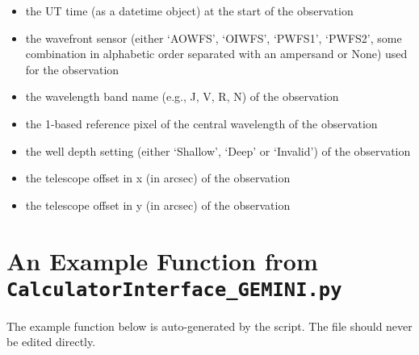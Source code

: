 \documentclass[letterpaper,10pt,english]{sphinxmanual}
\begin{document}
\begin{itemize}
\item {} 
the UT time (as a datetime object) at the start of the observation

\end{itemize}

\begin{itemize}
\item {} 
the wavefront sensor (either `AOWFS', `OIWFS', `PWFS1', `PWFS2', some
combination in alphabetic order separated with an ampersand or None) used for
the observation

\end{itemize}

\begin{itemize}
\item {} 
the wavelength band name (e.g., J, V, R, N) of the observation

\end{itemize}

\begin{itemize}
\item {} 
the 1-based reference pixel of the central wavelength of the observation

\end{itemize}

\begin{itemize}
\item {} 
the well depth setting (either `Shallow', `Deep' or `Invalid') of the
observation

\end{itemize}

\begin{itemize}
\item {} 
the telescope offset in x (in arcsec) of the observation

\end{itemize}

\begin{itemize}
\item {} 
the telescope offset in y (in arcsec) of the observation

\end{itemize}


\chapter{An Example Function from \texttt{CalculatorInterface\_GEMINI.py}}
\label{appendices/appendixB:an-example-function-from-calculatorinterface-gemini-py}\label{appendices/appendixB::doc}\label{appendices/appendixB:appendix-ci}
The example function below is auto-generated by the
 script. The  file
should never be edited directly.
\end{document}
